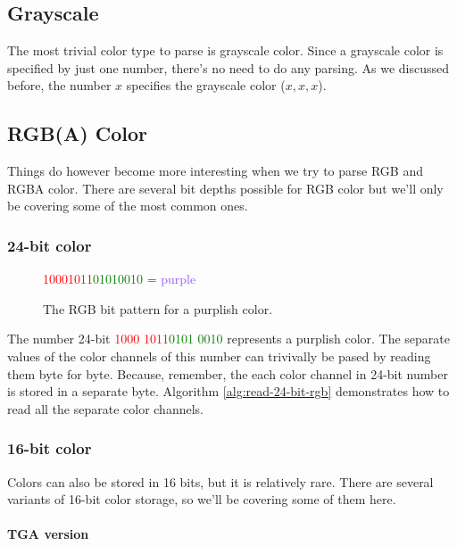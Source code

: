 \subsection{Grayscale}

The most trivial color type to parse is grayscale color. Since a
grayscale color is specified by just one number, there's no need to
do any parsing. As we discussed before, the number $x$ specifies the
grayscale color \mbox{($x,x,x$)}. 

\subsection{RGB(A) Color}

Things do however become more interesting when we try to parse RGB
and RGBA color. There are several bit depths possible for RGB
color but we'll only be covering some of the most common ones.

\subsubsection{24-bit color}

\begin{figure}
  \centering
  {\huge\textcolor{red}{10001011}\textcolor{green}{01010010}\textcolor{blue}{\fullbyte}
    = \textcolor[HTML]{8B52FF}{purple}}
  \caption{The RGB bit pattern for a purplish color.}
  \label{fig:24-bit-colors-bits}
\end{figure}

The number 24-bit \textcolor{red}{1000 1011}\textcolor{green}{0101
  0010}\textcolor{blue}{\fullbyte} represents a purplish color. The
separate values of the color channels of this number can trivivally
be pased by reading them byte for byte. Because, remember, the each
color channel in 24-bit number is stored in a separate
byte. Algorithm \ref{alg:read-24-bit-rgb} demonstrates how to read
all the separate color channels.


\subsubsection{16-bit color}

Colors can also be stored in 16 bits, but it is relatively
rare. There are several variants of 16-bit color storage, so we'll
be covering some of them here.

\paragraph{TGA version}

